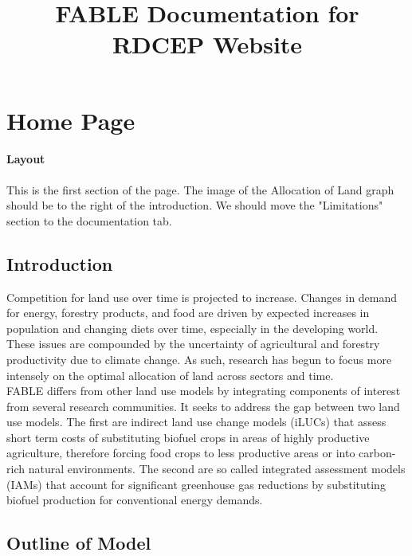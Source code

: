 \documentclass[10pt]{article}
\begin{document}
\title{FABLE Documentation for RDCEP Website}
\maketitle


\section{Home Page}
\paragraph{Layout}
This is the first section of the page. The image of the Allocation of Land graph should be to the right of the introduction. We should move the "Limitations" section to the documentation tab. 
\subsection{Introduction}
Competition for land use over time is projected to increase. Changes in demand for energy, forestry products, and food are driven by expected increases in population and changing diets over time, especially in the developing world. These issues are compounded by the uncertainty of agricultural and forestry productivity due to climate change. As such, research has begun to focus more intensely on the optimal allocation of land across sectors and time.\\
FABLE differs from other land use models by integrating components of interest from several research communities. It seeks to address the gap between two land use models. The first are indirect land use change models (iLUCs) that assess short term costs of substituting biofuel crops in areas of highly productive agriculture, therefore forcing food crops to less productive areas or into carbon-rich natural environments. The second are so called integrated assessment models (IAMs) that account for significant greenhouse gas reductions by substituting biofuel production for conventional energy demands.

\subsection{Outline of Model}
\end{document}
